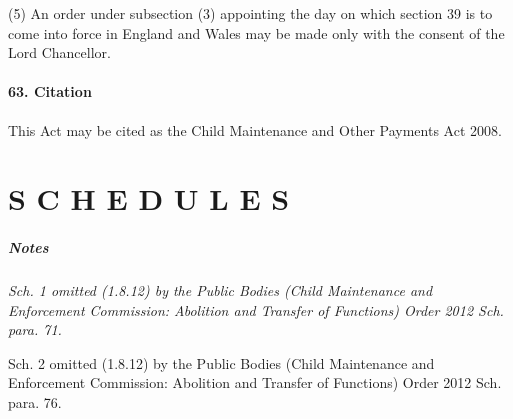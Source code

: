 \documentclass[a4paper]{article}
\newcommand\amendment[1]{\subsubsection*{Notes}{\itshape\frenchspacing\footnotesize #1 \par}}
\begin{document}
(5) An order under subsection (3) appointing the day on which section 39 is to come into force in England and Wales may be made only with the consent of the Lord Chancellor.

\subsection{63. Citation}

This Act may be cited as the Child Maintenance and Other Payments Act 2008.

\clearpage

\part*{S C H E D U L E S}

\amendment{
Sch. 1 omitted  (1.8.12) by the Public Bodies (Child Maintenance and Enforcement Commission: Abolition and Transfer of Functions) Order 2012 Sch. para. 71.

\medskip

Sch. 2 omitted  (1.8.12) by the Public Bodies (Child Maintenance and Enforcement Commission: Abolition and Transfer of Functions) Order 2012 Sch. para. 76.

}
\end{document}
